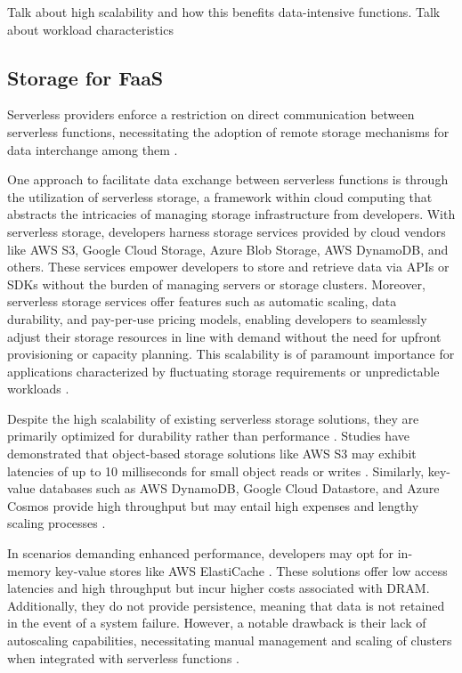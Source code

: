 Talk about high scalability and how this benefits data-intensive functions. Talk about workload characteristics

\subsection{Storage for FaaS}

Serverless providers enforce a restriction on direct communication between serverless functions, necessitating the adoption of remote storage mechanisms for data interchange among them \cite{jonas2019cloud,klimovic2018pocket,romero2021faat}.

One approach to facilitate data exchange between serverless functions is through the utilization of serverless storage, a framework within cloud computing that abstracts the intricacies of managing storage infrastructure from developers. With serverless storage, developers harness storage services provided by cloud vendors like AWS S3, Google Cloud Storage, Azure Blob Storage, AWS DynamoDB, and others. These services empower developers to store and retrieve data via APIs or SDKs without the burden of managing servers or storage clusters. Moreover, serverless storage services offer features such as automatic scaling, data durability, and pay-per-use pricing models, enabling developers to seamlessly adjust their storage resources in line with demand without the need for upfront provisioning or capacity planning. This scalability is of paramount importance for applications characterized by fluctuating storage requirements or unpredictable workloads  \cite{CloudObj90:online,AmazonDy45:online,DeCandia2007,AzureBlo83:online,CloudSto52:online,Datastor50:online,AzureCos63:online}.

Despite the high scalability of existing serverless storage solutions, they are primarily optimized for durability rather than performance \cite{jonas2019cloud,klimovic2018pocket,10.14778/3587136.3587139}. Studies have demonstrated that object-based storage solutions like AWS S3 may exhibit latencies of up to 10 milliseconds for small object reads or writes \cite{PublicCl96:online}. Similarly, key-value databases such as AWS DynamoDB, Google Cloud Datastore, and Azure Cosmos provide high throughput but may entail high expenses and lengthy scaling processes \cite{jonas2019cloud}.

In scenarios demanding enhanced performance, developers may opt for in-memory key-value stores like AWS ElastiCache \cite{AmazonEl88:online}. These solutions offer low access latencies and high throughput but incur higher costs associated with DRAM. Additionally, they do not provide persistence, meaning that data is not retained in the event of a system failure. However, a notable drawback is their lack of autoscaling capabilities, necessitating manual management and scaling of clusters when integrated with serverless functions \cite{jonas2019cloud,klimovic2018pocket,10.14778/3587136.3587139}.


